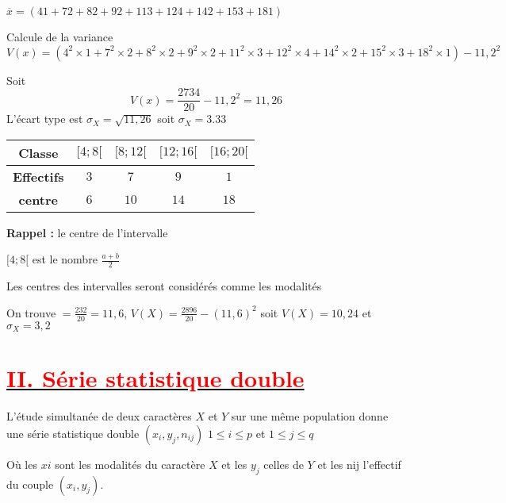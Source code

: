 \documentclass[12pt]{article}
\begin{document}
$\overline{x}= (4 1 +7 2 + 8 2 + 9 2 + 11 3 + 12 4 +14 2 +15 3 +18 1)$

Calcule de la variance
\[
V(x) = \left( 4^2 \times 1 + 7^2 \times 2 + 8^2 \times 2 + 9^2 \times 2 + 11^2 \times 3 + 12^2 \times 4 + 14^2 \times 2 + 15^2 \times 3 + 18^2 \times 1 \right) - 11,2^2
\]

Soit \[V(x)=\frac{2734}{20}-11,2^{2}=11,26\]
L'écart type est $\sigma_{X}=\sqrt{11,26}$ soit $\sigma_{X}=3.33$

\begin{table}[h]
\begin{tabular}{|c|c|c|c|c|}
\hline
\textbf{Classe}  & $[4 ; 8[$ & $[8 ; 12[$ & $[12 ; 16[$ & $[16 ; 20[$ \\
\hline
\textbf{Effectifs}  & $3$ & $7$  & $9$ & $1$  \\
\hline
\textbf{centre}  & $6$ & $10$ & $14$ & $18$  \\
\hline
\end{tabular}
\end{table}

\textbf{Rappel :} le centre de l’intervalle   

 $[4 ; 8[$ est le nombre $\frac{a+b}{2}$  
 
Les centres des intervalles seront considérés comme les modalités  

On trouve  $=\frac{232}{20}=11,6$, $V(X)=\frac{2896}{20}-(11,6)^{2}$ soit $V(X)=10,24$ et $\sigma_{X}=3,2$
\section*{\underline{\textbf{\textcolor{red}{II. Série statistique double}}}}
L’étude simultanée de deux caractères $X$ et $Y$ sur une même population   donne une série statistique double ${(x_{i} , y_{j}, n_{ij})}$   $1\leq i\leq  p$ et $1\leq j\leq q$

Où les $xi$ sont les modalités du caractère $X$ et les $y_{j}$ celles de $Y$ et les nij l’effectif du couple   $(x_{i} , y_{j})$.
\end{document}
